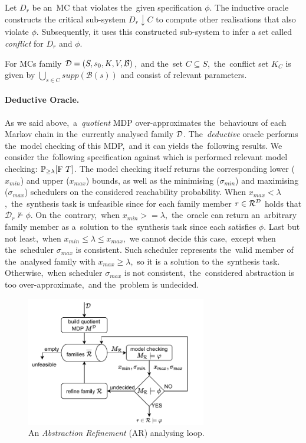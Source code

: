 Let $D_r$ be an~MC that violates the~given specification $\phi$.
The inductive oracle constructs the critical sub-system $D_r \! \downarrow \! C$ to compute other realisations that also violate $\phi$.
Subsequently, it uses this constructed sub-system to infer a set called \textit{conflict} for $D_r$ and $\phi$.

\begin{definition}[Conflict] \label{def:conflict_set}
For MCs family $\mathcal{D} = (S,s_{0},K, V, \mathcal{B})$,~and the~set $C \subseteq S$,~the~conflict set $K_C$ is given by $\bigcup_{s \in C} supp(\mathcal{B}(s))$ and consist of relevant parameters.
\end{definition}

\paragraph{Deductive Oracle.}
As we said above,~a~\textit{quotient} MDP over-approximates the~behaviours of each Markov chain in the~currently analysed family $\mathcal{D}$.
The~\textit{deductive} oracle performs the~model checking of this MDP,~and it can yields the~following results.
We consider the~following specification against which is performed relevant model checking: $\mathbb{P}_{\geq \lambda}[\mathrm{F}\ T]$.
The model checking itself returns the corresponding lower ($x_{min}$) and upper ($x_{max}$) bounds, as well as the minimising ($\sigma_{min}$) and maximising ($\sigma_{max}$) schedulers on the considered reachability probability.
When $x_{max} < \lambda$,~the~synthesis task is unfeasible since for each family member $r \in \mathcal{R}^{\mathcal{D}}$ holds that $\mathcal{D}_r \not\models \phi$.
On the~contrary,~when $x_{min} >= \lambda$,~the~oracle can return an~arbitrary family member as a~solution to the~synthesis task since each satisfies $\phi$.
Last but not least,~when $x_{min} \leq \lambda \leq x_{max}$,~we cannot decide this case,~except when the~scheduler $\sigma_{max}$ is consistent.
Such scheduler represents the~valid member of the~analysed family with $x_{max} \geq \lambda$,~so it is a solution to the~synthesis task.
Otherwise,~when scheduler $\sigma_{max}$ is not consistent,~the~considered abstraction is too over-approximate,~and the~problem is undecided.

\begin{figure}[h!]
\centering
\includegraphics[width=0.70\textwidth]{figures/ar_loop.pdf}
\caption{An \textit{Abstraction Refinement} (AR) analysing loop.}%
\label{fig:architecture}%
\end{figure}


